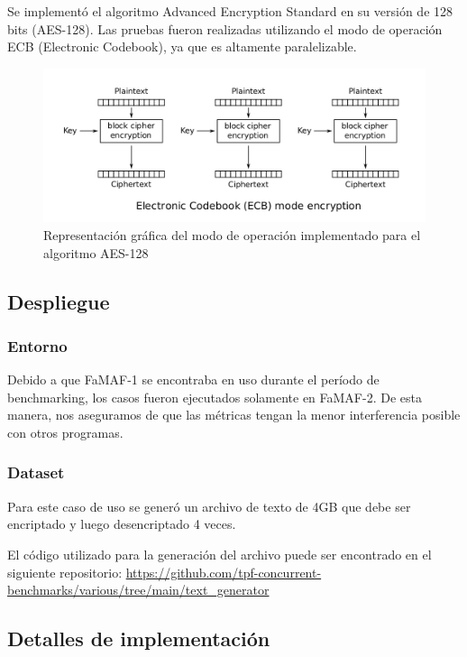\documentclass[11pt]{article}
\let\Oldsubsection\subsection
\renewcommand{\subsection}{\FloatBarrier\Oldsubsection}
\let\Oldsubsubsection\subsubsection
\renewcommand{\subsubsection}{\FloatBarrier\Oldsubsubsection}
\begin{document}
Se implementó el algoritmo Advanced Encryption Standard en su versión de 128 bits (AES-128). Las pruebas fueron realizadas utilizando el modo de operación ECB (Electronic Codebook), ya que es altamente paralelizable.

\begin{figure}[h]
    \centering
    \includegraphics[scale=0.2]{resources/aes/ecb.png}
    \caption{Representación gráfica del modo de operación implementado para el algoritmo AES-128}
    \label{fig:aes_ecb}
\end{figure}

\subsection{Despliegue}

\subsubsection{Entorno}

Debido a que FaMAF-1 se encontraba en uso durante el período de benchmarking, los casos fueron ejecutados solamente en FaMAF-2. De esta manera, nos aseguramos de que las métricas tengan la menor interferencia posible con otros programas.

\subsubsection{Dataset}

Para este caso de uso se generó un archivo de texto de 4GB que debe ser encriptado y luego desencriptado 4 veces.

El código utilizado para la generación del archivo puede ser encontrado en el siguiente repositorio: \url{https://github.com/tpf-concurrent-benchmarks/various/tree/main/text_generator}

\subsection{Detalles de implementación}
\end{document}
